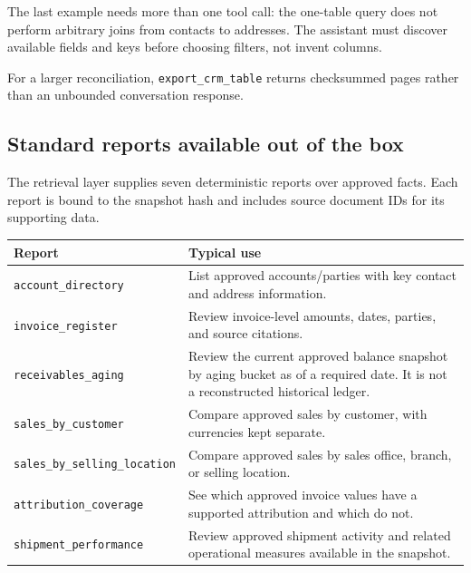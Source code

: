 \documentclass[
]{article}
\newcounter{none} %
\begin{document}
The last example needs more than one tool call: the one-table query does
not perform arbitrary joins from contacts to addresses. The assistant
must discover available fields and keys before choosing filters, not
invent columns.

For a larger reconciliation,
\texttt{export\_\allowbreak{}crm\_\allowbreak{}table} returns
checksummed pages rather than an unbounded conversation response.

\subsection{Standard reports available out of the
box}\label{standard-reports-available-out-of-the-box}

The retrieval layer supplies seven deterministic reports over approved
facts. Each report is bound to the snapshot hash and includes source
document IDs for its supporting data.

{\def\LTcaptype{none} %
\begin{longtable}[]{@{}
  >{\raggedright\arraybackslash}p{}
  >{\raggedright\arraybackslash}p{}@{}}
\toprule\noalign{}
\begin{minipage}[b]{\linewidth}\raggedright
Report
\end{minipage} & \begin{minipage}[b]{\linewidth}\raggedright
Typical use
\end{minipage} \\
\midrule\noalign{}
\endhead
\bottomrule\noalign{}
\endlastfoot
\texttt{account\_\allowbreak{}directory} & List approved
accounts/parties with key contact and address information. \\
\texttt{invoice\_\allowbreak{}register} & Review invoice-level amounts,
dates, parties, and source citations. \\
\texttt{receivables\_\allowbreak{}aging} & Review the current approved
balance snapshot by aging bucket as of a required date. It is not a
reconstructed historical ledger. \\
\texttt{sales\_\allowbreak{}by\_\allowbreak{}customer} & Compare
approved sales by customer, with currencies kept separate. \\
\texttt{sales\_\allowbreak{}by\_\allowbreak{}selling\_\allowbreak{}location}
& Compare approved sales by sales office, branch, or selling
location. \\
\texttt{attribution\_\allowbreak{}coverage} & See which approved invoice
values have a supported attribution and which do not. \\
\texttt{shipment\_\allowbreak{}performance} & Review approved shipment
activity and related operational measures available in the snapshot. \\
\end{longtable}
}
\end{document}
